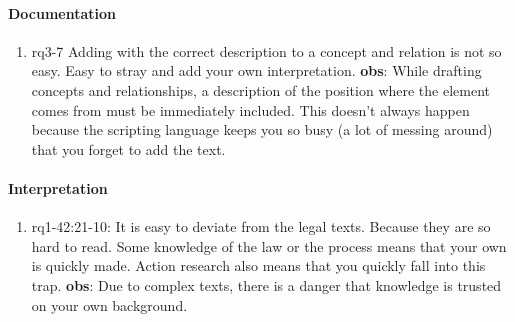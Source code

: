 \paragraph{Documentation}
\begin{enumerate}
    \item rq3-7 Adding  with the correct description to a concept and relation is not so easy.
    Easy to stray and add your own interpretation.
    \newline\textbf{obs}: While drafting concepts and relationships, a description of the position where the element comes from must be immediately included.
    This doesn't always happen because the scripting language keeps you so busy (a lot of messing around) that you forget to add the text.

\end{enumerate}

\paragraph{Interpretation}
\begin{enumerate}
    \item rq1-42:21-10: It is easy to deviate from the legal texts.
    Because they are so hard to read.
    Some knowledge of the {law} or the process means that your own  is quickly made.
    Action research also means that you quickly fall into this trap.
    \newline\textbf{obs}: Due to complex texts, there is a danger that knowledge is trusted on your own background.

\end{enumerate}

